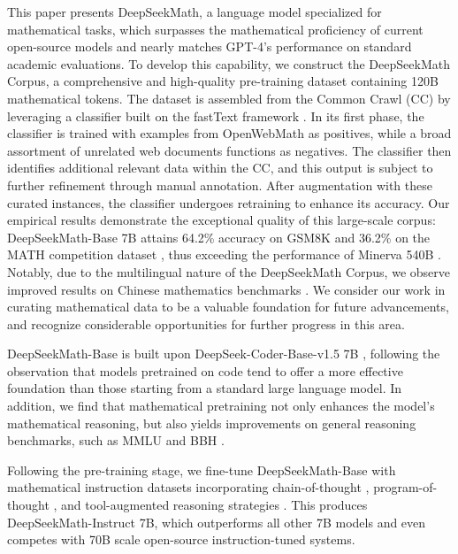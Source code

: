 This paper presents DeepSeekMath, a language model specialized for mathematical tasks, which surpasses the mathematical proficiency of current open-source models and nearly matches GPT-4's performance on standard academic evaluations. To develop this capability, we construct the DeepSeekMath Corpus, a comprehensive and high-quality pre-training dataset containing 120B mathematical tokens. The dataset is assembled from the Common Crawl (CC) by leveraging a classifier built on the fastText framework \citep{joulin2016fasttext}. In its first phase, the classifier is trained with examples from OpenWebMath \citep{openwebmath} as positives, while a broad assortment of unrelated web documents functions as negatives. The classifier then identifies additional relevant data within the CC, and this output is subject to further refinement through manual annotation. After augmentation with these curated instances, the classifier undergoes retraining to enhance its accuracy. Our empirical results demonstrate the exceptional quality of this large-scale corpus: DeepSeekMath-Base 7B attains 64.2\% accuracy on GSM8K \citep{gsm8k} and 36.2\% on the MATH competition dataset \citep{MATH}, thus exceeding the performance of Minerva 540B \citep{minerva}. Notably, due to the multilingual nature of the DeepSeekMath Corpus, we observe improved results on Chinese mathematics benchmarks \citep{wei2023cmath,agieval}. We consider our work in curating mathematical data to be a valuable foundation for future advancements, and recognize considerable opportunities for further progress in this area.

DeepSeekMath-Base is built upon DeepSeek-Coder-Base-v1.5 7B \citep{deepseek-coder}, following the observation that models pretrained on code tend to offer a more effective foundation than those starting from a standard large language model. In addition, we find that mathematical pretraining not only enhances the model’s mathematical reasoning, but also yields improvements on general reasoning benchmarks, such as MMLU \citep{mmlu} and BBH \citep{bbh}.

Following the pre-training stage, we fine-tune DeepSeekMath-Base with mathematical instruction datasets incorporating chain-of-thought \citep{cot}, program-of-thought \citep{pot,pal}, and tool-augmented reasoning strategies \citep{tora}. This produces DeepSeekMath-Instruct 7B, which outperforms all other 7B models and even competes with 70B scale open-source instruction-tuned systems.

